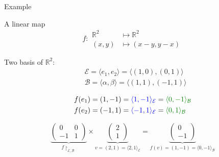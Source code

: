 \documentclass{beamer}
\begin{document}
\begin{frame}{Example}
  \begin{exampleblock}{A linear map}
    \[f: \begin{aligned} \mathbb{R}^2 &\mapsto \mathbb{R}^2\\ (x,y) &\mapsto (x - y, y - x) \end{aligned}\]

    Two basis of $\mathbb{R}^2 :$
    \[\begin{aligned}
    &\mathcal{E} = \langle e_1, e_2 \rangle = \langle (1,0), (0,1) \rangle \\ 
    &\mathcal{B} = \langle \alpha, \beta \rangle = \langle (1,1), (-1, 1) \rangle\\
    \end{aligned}
    \]
    \[
    \begin{aligned}
      &f(e_1) = (1,-1) = {\color{blue} \langle 1, -1 \rangle_{\mathcal{E}}} = {\color{darkgreen} \langle 0, -1\rangle_{\mathcal{B}}}\\
      &f(e_2) = (-1, 1) = {\color{blue} \langle -1, 1 \rangle_{\mathcal{E}}} = {\color{darkgreen} \langle 0, 1 \rangle_{\mathcal{B}}} \\      
    \end{aligned}
    \]


    \[
    \underbrace{
    \begin{pmatrix}
      0 & 0 \\
      -1 & 1
    \end{pmatrix}
    }_{f\restriction_{\mathcal{E}, \mathcal{B}}}
    \times
    \underbrace{
    \begin{pmatrix}
      2\\
      1
    \end{pmatrix}
    }_{v = (2,1) = \langle 2, 1\rangle_{\mathcal{E}}}
    =
    \underbrace{
      \begin{pmatrix}
        0\\
        -1
      \end{pmatrix}
    }_{f(v) = (1, -1) = \langle 0,-1 \rangle_{\mathcal{B}}}
    \]  
  \end{exampleblock}
\end{frame}
\end{document}
